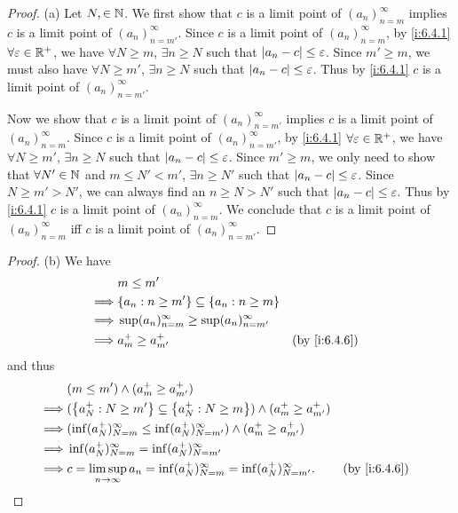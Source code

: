 \begin{proof}{(a)}
  Let \(N, \in \mathbb{N}\).
  We first show that \(c\) is a limit point of \((a_n)_{n = m}^\infty\) implies \(c\) is a limit point of \((a_n)_{n = m'}^\infty\).
  Since \(c\) is a limit point of \((a_n)_{n = m}^\infty\), by \cref{i:6.4.1} \(\forall \varepsilon \in \mathbb{R}^+\), we have \(\forall N \geq m\), \(\exists n \geq N\) such that \(\left\lvert a_n - c\right\rvert \leq \varepsilon\).
  Since \(m' \geq m\), we must also have \(\forall N \geq m'\), \(\exists n \geq N\) such that \(\left\lvert a_n - c\right\rvert \leq \varepsilon\).
  Thus by \cref{i:6.4.1} \(c\) is a limit point of \((a_n)_{n = m'}^\infty\).

  Now we show that \(c\) is a limit point of \((a_n)_{n = m'}^\infty\) implies \(c\) is a limit point of \((a_n)_{n = m}^\infty\).
  Since \(c\) is a limit point of \((a_n)_{n = m'}^\infty\), by \cref{i:6.4.1} \(\forall \varepsilon \in \mathbb{R}^+\), we have \(\forall N \geq m'\), \(\exists n \geq N\) such that \(\left\lvert a_n - c\right\rvert \leq \varepsilon\).
  Since \(m' \geq m\), we only need to show that \(\forall N' \in \mathbb{N}\) and \(m \leq N' < m'\), \(\exists n \geq N'\) such that \(\left\lvert a_n - c\right\rvert \leq \varepsilon\).
  Since \(N \geq m' > N'\), we can always find an \(n \geq N > N'\) such that \(\left\lvert a_n - c\right\rvert \leq \varepsilon\).
  Thus by \cref{i:6.4.1} \(c\) is a limit point of \((a_n)_{n = m}^\infty\).
  We conclude that \(c\) is a limit point of \((a_n)_{n = m}^\infty\) iff \(c\) is a limit point of \((a_n)_{n = m'}^\infty\).
\end{proof}

\begin{proof}{(b)}
  We have
  \begin{align*}
             & m \leq m'                                                                 \\
    \implies & \set{a_n : n \geq m'} \subseteq \set{a_n : n \geq m}                      \\
    \implies & \sup(a_n)_{n = m}^\infty \geq \sup(a_n)_{n = m'}^\infty                   \\
    \implies & a_m^+ \geq a_{m'}^+                                     &  & \by{i:6.4.6}
  \end{align*}
  and thus
  \begin{align*}
             & (m \leq m') \land (a_m^+ \geq a_{m'}^+)                                                                      \\
    \implies & (\set{a_N^+ : N \geq m'} \subseteq \set{a_N^+ : N \geq m}) \land (a_m^+ \geq a_{m'}^+)                       \\
    \implies & (\inf(a_N^+)_{N = m}^\infty \leq \inf(a_N^+)_{N = m'}^\infty) \land (a_m^+ \geq a_{m'}^+)                    \\
    \implies & \inf(a_N^+)_{N = m}^\infty = \inf(a_N^+)_{N = m'}^\infty                                                     \\
    \implies & c = \limsup_{n \to \infty} a_n = \inf(a_N^+)_{N = m}^\infty = \inf(a_N^+)_{N = m'}^\infty. &  & \by{i:6.4.6}
  \end{align*}
\end{proof}

